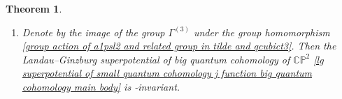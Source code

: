 \documentclass[11pt]{article}
\numberwithin{equation}{section}
\numberwithin{equation}{section}
\newtheorem{Theorem}{Theorem}[section]
\begin{document}
\begin{Theorem}
\begin{enumerate}
The coefficients  belong to the following ring
.

 In addition, the correspondent Abelian differential $\phi$ is given by
\begin{gather}\label{volume form of Big quantum cohomology 1 Milanov deformation section}
\phi=-\frac{2^{\frac{5}{2}}}{2\pi}\frac{\Delta^{\frac{1}{6}}\bigl(\tilde\tau_{12}, Q^{\frac{1}{3}}t^3 \bigr)}{Q^{\frac{1}{6}}}{\rm d}\tilde\tau_{12},
\end{gather}
where $\Delta\bigl(\tilde\tau_{12}, Q^{\frac{1}{3}}t^3 \bigr)$ is defined in \eqref{modular deformation tilde 0}.

\item[$(2)$]
Denote by  the image of the group $\Gamma^{(3)}$ under the group homomorphism \eqref{group action of a1psl2 and related group in tilde and qcubict3}. Then the Landau--Ginzburg superpotential of big quantum cohomology of $\mathbb{CP}^2$ \eqref{lg superpotential of small quantum cohomology j function big quantum cohomology main body} is -invariant.
\end{enumerate}

\end{Theorem}
\end{document}
